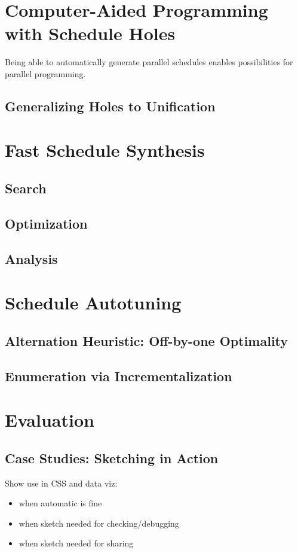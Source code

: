 \section{Computer-Aided Programming with Schedule Holes}
\label{sec:holes}
Being able to automatically generate parallel schedules enables possibilities for parallel programming.	

\subsection{Generalizing Holes to Unification}

\section{Fast Schedule Synthesis}
\subsection{Search}
\subsection{Optimization}
\subsection{Analysis}

\section{Schedule Autotuning}
\label{sec:schedtuning}
\subsection{Alternation Heuristic: Off-by-one Optimality}
\subsection{Enumeration via Incrementalization}

\section{Evaluation}
\subsection{Case Studies: Sketching in Action}
Show use in CSS and data viz: 
\begin{itemize}
\item when automatic is fine
\item when sketch needed for checking/debugging
\item when sketch needed for sharing
\end{itemize}
